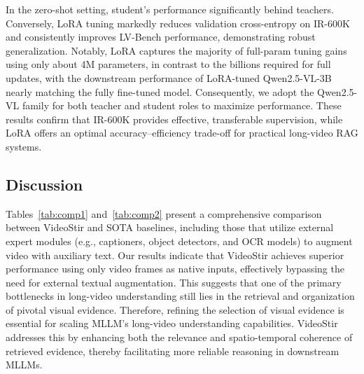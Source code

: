 In the zero-shot setting, student's performance significantly behind teachers. Conversely, LoRA tuning markedly reduces validation cross-entropy on IR-600K and consistently improves LV-Bench performance, demonstrating robust generalization. Notably, LoRA captures the majority of full-param tuning gains using only about 4M parameters, in contrast to the billions required for full updates, with the downstream performance of LoRA-tuned Qwen2.5-VL-3B nearly matching the fully fine-tuned model. Consequently, we adopt the Qwen2.5-VL family for both teacher and student roles to maximize performance. These results confirm that IR-600K provides effective, transferable supervision, while LoRA offers an optimal accuracy–efficiency trade-off for practical long-video RAG systems.






\subsection{Discussion}
Tables~\ref{tab:comp1} and~\ref{tab:comp2} present a comprehensive comparison between VideoStir and SOTA baselines, including those that utilize external expert modules (e.g., captioners, object detectors, and OCR models) to augment video with auxiliary text. Our results indicate that VideoStir achieves superior performance using only video frames as native inputs, effectively bypassing the need for external textual augmentation. This suggests that one of the primary bottlenecks in long-video understanding still lies in the retrieval and organization of pivotal visual evidence. Therefore, refining the selection of visual evidence is essential for scaling MLLM's long-video understanding capabilities. VideoStir addresses this by enhancing both the relevance and spatio-temporal coherence of retrieved evidence, thereby facilitating more reliable reasoning in downstream MLLMs.

\nocite{gu2023orsi,gu2025optical,gu2025acl,gu2025sfir,gu2025efficient,gu2024mixed,fu2025brainvis,fu2023sgcn,fu2024dp,gu2025hdtcnet,fu2025vistawise,fu2025contextnav,ren2025wamo,fu2025sdr,liu2025correlationcausationmaxpoolingbasedmultiinstance,liu2025hacsurv,zhang2024defending,zhang2025tuning,zhang2026test,ti2025towards,zhang2025tokenswap,zhang2025improving,mei2026gateddifferentiableworkingmemory,mei2025surveycontextengineeringlarge,mei2024hiddenguard,mei2025a1,mei2024not,li2024vulnerability,li2024think,li2024drs,li2025texture,xiong2025thinking,xiong2025unveiling,ge2025focusingcontrastiveattentionenhancing,ge2024can,ge2025innate,ge2025mrfdmultiregionfusiondecoding}

